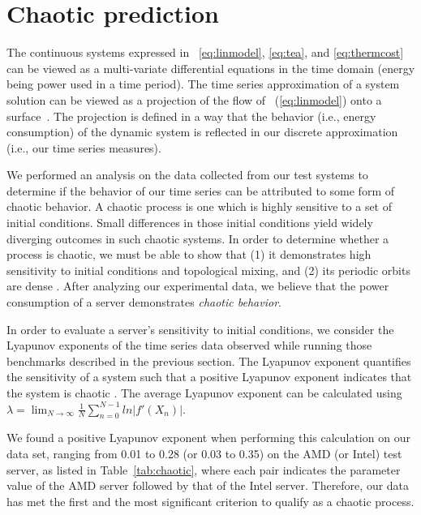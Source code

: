 \section{Chaotic prediction}
\label{sec:chaospredict}
The continuous systems expressed in \equationname~\eqref{eq:linmodel},
\eqref{eq:tea}, and \eqref{eq:thermcost} can
be viewed as a multi-variate differential equations in the time domain
(energy being power used in a time period).  The time series
approximation of a system solution can be viewed as a projection of
the flow of \equationname~(\ref{eq:linmodel}) onto a surface~\cite{Liu2010}.
The projection is defined in a way that the behavior (i.e., energy consumption)
of the dynamic system is reflected in our discrete approximation
(i.e., our time series measures).

We performed an analysis on the data collected from our test systems to
determine if the behavior of our time series can be attributed to some
form of chaotic behavior.  A chaotic process is one which is highly
sensitive to a set of initial conditions.  Small differences in those
initial conditions yield widely diverging outcomes in such chaotic
systems.  In order to determine whether a process is chaotic, we must be
able to show that (1) it demonstrates high sensitivity to initial
conditions and topological mixing, and (2) its periodic orbits are dense
\cite{Sprott2003}.  After analyzing our experimental data, we believe
that the power consumption of a server demonstrates \textit{chaotic behavior}.

In order to evaluate a server's sensitivity to initial conditions, we
consider the Lyapunov exponents of the time series data observed while
running those benchmarks described in the previous section.  The
Lyapunov exponent quantifies the sensitivity of a system such that a
positive Lyapunov exponent indicates that the system is chaotic
\cite{Sprott2003}.  The average Lyapunov exponent can be calculated using
$\lambda = \lim_{N\to\infty}\frac{1}{N}\sum_{n=0}^{N-1}ln|f'(X_n)|$.

We found a positive Lyapunov exponent when performing this calculation
on our data set, ranging from 0.01 to 0.28 (or 0.03 to 0.35) on the AMD
(or Intel) test server, as listed in Table~\ref{tab:chaotic}, where
each pair indicates the parameter value of the AMD server followed by
that of the Intel server.  Therefore, our data has met the first and
the most significant criterion to qualify as a chaotic process.

